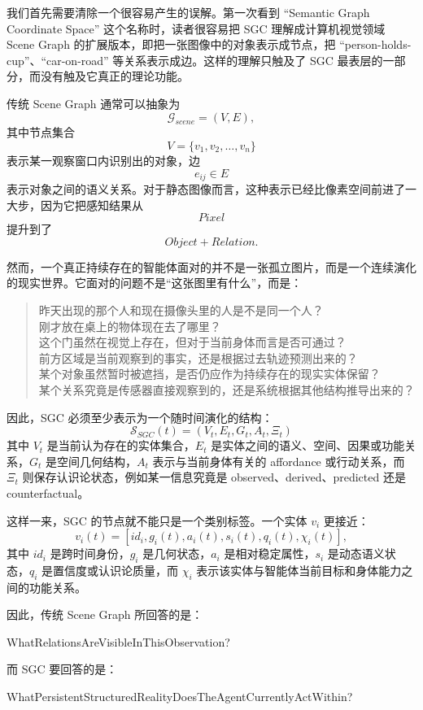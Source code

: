 我们首先需要清除一个很容易产生的误解。第一次看到 ``Semantic Graph Coordinate Space'' 这个名称时，读者很容易把 SGC 理解成计算机视觉领域 Scene Graph 的扩展版本，即把一张图像中的对象表示成节点，把 ``person-holds-cup''、``car-on-road'' 等关系表示成边。这样的理解只触及了 SGC 最表层的一部分，而没有触及它真正的理论功能。

传统 Scene Graph 通常可以抽象为
\[
\mathcal{G}_{scene}
=
(V,E),
\]
其中节点集合
\[
V=\{v_1,v_2,\ldots,v_n\}
\]
表示某一观察窗口内识别出的对象，边
\[
e_{ij}\in E
\]
表示对象之间的语义关系。对于静态图像而言，这种表示已经比像素空间前进了一大步，因为它把感知结果从
\[
Pixel
\]
提升到了
\[
Object + Relation.
\]

然而，一个真正持续存在的智能体面对的并不是一张孤立图片，而是一个连续演化的现实世界。它面对的问题不是“这张图里有什么”，而是：
\begin{quote}
昨天出现的那个人和现在摄像头里的人是不是同一个人？\\
刚才放在桌上的物体现在去了哪里？\\
这个门虽然在视觉上存在，但对于当前身体而言是否可通过？\\
前方区域是当前观察到的事实，还是根据过去轨迹预测出来的？\\
某个对象虽然暂时被遮挡，是否仍应作为持续存在的现实实体保留？\\
某个关系究竟是传感器直接观察到的，还是系统根据其他结构推导出来的？
\end{quote}

因此，SGC 必须至少表示为一个随时间演化的结构：
\[
\boxed{
\mathcal{S}_{SGC}(t)
=
\left(
V_t,
E_t,
G_t,
A_t,
\Xi_t
\right)
}
\]
其中 \(V_t\) 是当前认为存在的实体集合，\(E_t\) 是实体之间的语义、空间、因果或功能关系，\(G_t\) 是空间几何结构，\(A_t\) 表示与当前身体有关的 affordance 或行动关系，而 \(\Xi_t\) 则保存认识论状态，例如某一信息究竟是 observed、derived、predicted 还是 counterfactual。

这样一来，SGC 的节点就不能只是一个类别标签。一个实体 \(v_i\) 更接近：
\[
v_i(t)
=
\left[
id_i,
g_i(t),
a_i(t),
s_i(t),
q_i(t),
\chi_i(t)
\right],
\]
其中 \(id_i\) 是跨时间身份，\(g_i\) 是几何状态，\(a_i\) 是相对稳定属性，\(s_i\) 是动态语义状态，\(q_i\) 是置信度或认识论质量，而 \(\chi_i\) 表示该实体与智能体当前目标和身体能力之间的功能关系。

因此，传统 Scene Graph 所回答的是：
\begin{statementbox}
WhatRelationsAreVisibleInThisObservation?
\end{statementbox}
而 SGC 要回答的是：
\begin{statementbox}
WhatPersistentStructuredRealityDoesTheAgentCurrentlyActWithin?
\end{statementbox}

